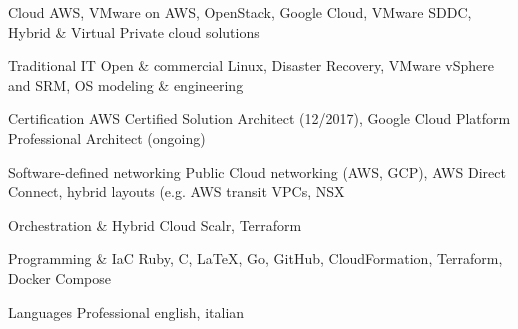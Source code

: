 
\begin{cvskills}

  \cvskill
    {Cloud} %
    {AWS, VMware on AWS, OpenStack, Google Cloud, VMware SDDC, Hybrid \& Virtual Private cloud solutions} %

  \cvskill
    {Traditional IT} %
    {Open \& commercial Linux, Disaster Recovery, VMware vSphere and SRM, OS modeling \& engineering} %

  \cvskill
    {Certification} %
    {AWS Certified Solution Architect (12/2017), Google Cloud Platform Professional Architect (ongoing)}

  \cvskill
    {Software-defined networking} %
    {Public Cloud networking (AWS, GCP), AWS Direct Connect, hybrid layouts (e.g. AWS transit VPCs, NSX}

  \cvskill
    {Orchestration \& Hybrid Cloud} %
    {Scalr, Terraform}

  \cvskill
    {Programming \& IaC} %
    {Ruby, C, \LaTeX, Go, GitHub, CloudFormation, Terraform, Docker Compose} %

  \cvskill
    {Languages} %
    {Professional english, italian} %

\end{cvskills}
